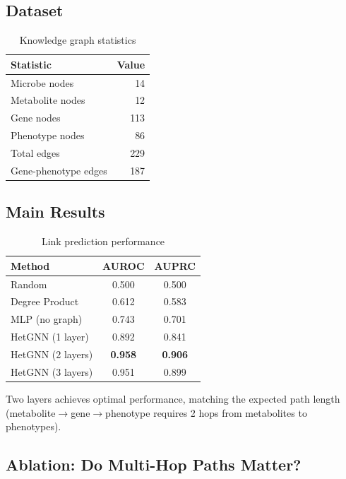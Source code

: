 \documentclass{article}
\begin{document}
\subsection{Dataset}

\begin{table}[h]
\centering
\caption{Knowledge graph statistics}
\label{tab:data}
\begin{tabular}{lr}
\toprule
\textbf{Statistic} & \textbf{Value} \\
\midrule
Microbe nodes & 14 \\
Metabolite nodes & 12 \\
Gene nodes & 113 \\
Phenotype nodes & 86 \\
\midrule
Total edges & 229 \\
Gene-phenotype edges & 187 \\
\bottomrule
\end{tabular}
\end{table}

\subsection{Main Results}

\begin{table}[h]
\centering
\caption{Link prediction performance}
\label{tab:main}
\begin{tabular}{lcc}
\toprule
\textbf{Method} & \textbf{AUROC} & \textbf{AUPRC} \\
\midrule
Random & 0.500 & 0.500 \\
Degree Product & 0.612 & 0.583 \\
MLP (no graph) & 0.743 & 0.701 \\
\midrule
HetGNN (1 layer) & 0.892 & 0.841 \\
HetGNN (2 layers) & \textbf{0.958} & \textbf{0.906} \\
HetGNN (3 layers) & 0.951 & 0.899 \\
\bottomrule
\end{tabular}
\end{table}

Two layers achieves optimal performance, matching the expected path length (metabolite$\rightarrow$gene$\rightarrow$phenotype requires 2 hops from metabolites to phenotypes).

\subsection{Ablation: Do Multi-Hop Paths Matter?}
\end{document}
